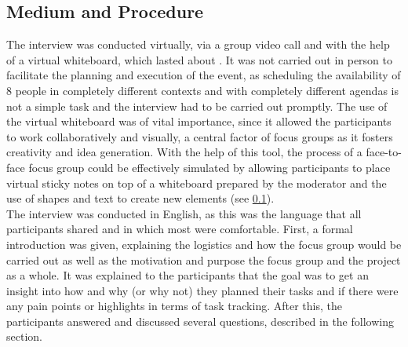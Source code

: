 \subsection{Medium and Procedure}
The interview was conducted virtually, via a group video call and with the help of a virtual whiteboard, which lasted about . It was not carried out in person to facilitate the planning and execution of the event, as scheduling the availability of 8 people in completely different contexts and with completely different agendas is not a simple task and the interview had to be carried out promptly. The use of the virtual whiteboard was of vital importance, since it allowed the participants to work collaboratively and visually, a central factor of focus groups as it fosters creativity and idea generation. With the help of this tool, the process of a face-to-face focus group could be effectively simulated by allowing participants to place virtual sticky notes on top of a whiteboard prepared by the moderator and the use of shapes and text to create new elements (see \ref{}). \\
The interview was conducted in English, as this was the language that all participants shared and in which most were comfortable. First, a formal introduction was given, explaining the logistics and how the focus group would be carried out as well as the motivation and purpose  the focus group and the project as a whole. It was explained to the participants that the goal was to get an insight into how and why (or why not) they planned their tasks and if there were any pain points or highlights in terms of task tracking. After this, the participants answered and discussed several questions, described in the following section.

